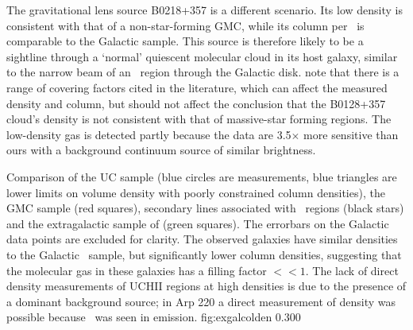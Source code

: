 
The gravitational lens source B0218+357 is a different scenario.  Its low
density is consistent with that of a non-star-forming GMC, while its column per
\kms\ is comparable to the Galactic sample.  This source is therefore likely to
be a sightline through a `normal' quiescent molecular cloud in its host galaxy,
similar to the narrow beam of an \uchii\ region through the Galactic disk.
\citet{Zeiger2010} note that there is a range of covering factors cited in the
literature, which can affect the measured density and column, but should not
affect the conclusion that the B0128+357 cloud's density is not consistent with
that of massive-star forming regions.  The low-density gas is detected partly
because the \citet{Zeiger2010} data are 3.5$\times$ more sensitive than ours 
with a background continuum source of similar brightness.

{Comparison of the UC sample (blue circles are measurements, blue
triangles are lower limits on volume density with poorly constrained column
densities), the GMC sample (red squares), secondary lines associated with
\uchii\ regions (black stars) and the extragalactic sample of
\citet{Mangum2008} (green squares).  The errorbars on the
Galactic data points are excluded for clarity.  The observed galaxies have
similar densities to the Galactic \uchii\ sample, but significantly lower
column densities, suggesting that the molecular gas in these galaxies has a
filling factor $<<1$.  The lack of direct density measurements of UCHII regions
at high densities is due to the presence of a dominant background source; in Arp 220 a
direct measurement of density was possible because \formaldehyde\ was seen in
emission.}
{fig:exgalcolden}
{0.30}{0}

